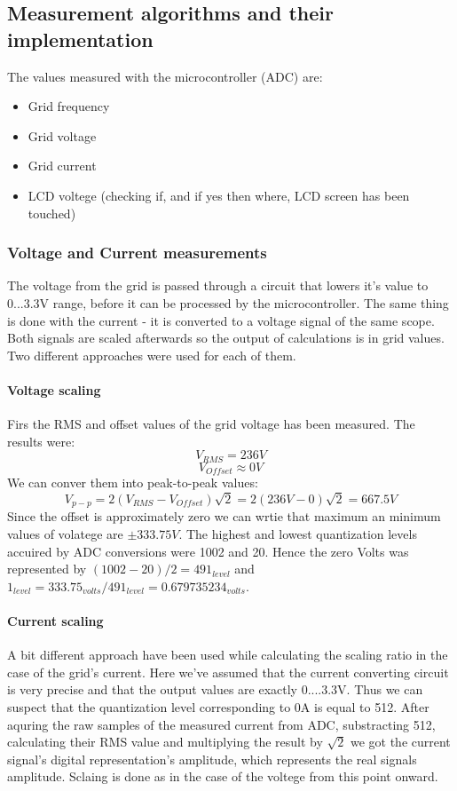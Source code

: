 \subsection{Measurement algorithms and their implementation}
The values measured with the microcontroller (ADC) are:
\begin{itemize}
\item Grid frequency
\item Grid voltage
\item Grid current
\item LCD voltege (checking if, and if yes then where, LCD screen has been touched)
\end{itemize}

\subsubsection{Voltage and Current measurements}
The voltage from the grid is passed through a circuit that lowers it's value to 0...3.3V range, before it can be processed by the microcontroller. The same thing is done with the current - it is converted to a voltage signal of the same scope. Both signals are scaled afterwards so the output of calculations is in grid values. Two different approaches were used for each of them.

\paragraph{Voltage scaling}
Firs the RMS and offset values of the grid voltage has been measured. The results were: 
\[ V_{RMS}=236V \] 
\[ V_{Offset} \approx 0V\]
We can conver them into peak-to-peak values:
\[ V_{p-p}=2(V_{RMS}-V_{Offset})\sqrt{2}=2(236V-0)\sqrt{2}=667.5V \]
Since the offset is approximately zero we can wrtie that maximum an minimum values of volatege are $ \pm333.75V $. The highest and lowest quantization levels accuired by ADC conversions were 1002 and 20. Hence the zero Volts was represented by $ (1002-20)/2=491_{level} $ and $ 1_{level}=333.75_{volts}/491_{level}=0.679735234_{volts} $.

\paragraph{Current scaling}
A bit different approach have been used while calculating the scaling ratio in the case of the grid's current. Here we've assumed that the current converting circuit is very precise and that the output values are exactly 0....3.3V. Thus we can suspect that the quantization level corresponding to 0A is equal to 512. After aquring the raw samples of the measured current from ADC, substracting 512, calculating their RMS value and multiplying the result by $ \sqrt{2} $ we got the current signal's digital representation's amplitude, which represents the real signals amplitude. Sclaing is done as in the case of the voltege from this point onward.

